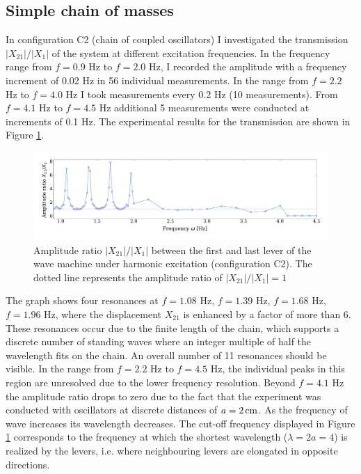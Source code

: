 \documentclass[12pt]{article}
\begin{document}
\subsection{Simple chain of masses}
In configuration C2 (chain of coupled oscillators) I investigated the transmission $|X_{21}|/|X_1|$ of the system at different excitation frequencies. In the frequency range from $f=0.9$ Hz to $f=2.0$ Hz, I recorded the amplitude with a frequency increment of 0.02 Hz in 56 individual measurements. In the range from $f=2.2$ Hz to $f=4.0$ Hz I took measurements every 0.2 Hz (10 measurements). From $f=4.1$ Hz to $f=4.5$ Hz additional 5 measurements were conducted at increments of 0.1 Hz. The experimental results for the transmission are shown in Figure \ref{fig:figure19}.
\begin{figure}[hbt]	
  \includegraphics[width=\columnwidth]{results/condition1_amplitude}
  \caption{Amplitude ratio $|X_{21}|/|X_1|$ between the first and last lever of the wave machine under harmonic excitation (configuration C2). The dotted line represents the amplitude ratio of  $|X_{21}|/|X_1|=1$}\label{fig:figure19}
\end{figure}
The graph shows four resonances at $f=1.08$ Hz, $f=1.39$ Hz, $f=1.68$ Hz, $f=1.96$ Hz, where the displacement $X_{21}$ is enhanced by a factor of more than 6. These resonances occur due to the finite length of the chain, which supports a discrete number of standing waves where an integer multiple of half the wavelength fits on the chain. An overall number of 11 resonances should be visible. In the range from $f=2.2$ Hz to $f=4.5$ Hz, the individual peaks in this region are unresolved due to the lower frequency resolution. Beyond $f=4.1$ Hz the amplitude ratio drops to zero due to the fact that the experiment was conducted with oscillators at discrete distances of $a=2\,{\rm cm}$. As the frequency of wave increases its wavelength decreases. The cut-off frequency displayed in Figure \ref{fig:figure19} corresponds to the frequency at which the shortest wavelength ($\lambda=2 a=4$) is realized by the levers, i.e. where neighbouring levers are elongated in opposite directions.
\end{document}
